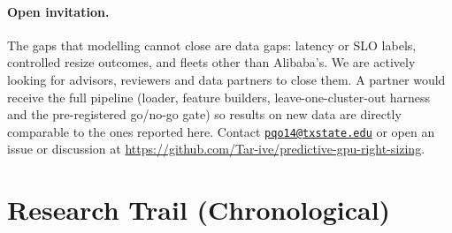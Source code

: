 \documentclass[11pt]{article}
\begin{document}
\paragraph{Open invitation.} The gaps that modelling cannot close are data gaps: latency or SLO labels, controlled resize outcomes, and fleets other than Alibaba's. We are actively looking for advisors, reviewers and data partners to close them. A partner would receive the full pipeline (loader, feature builders, leave-one-cluster-out harness and the pre-registered go/no-go gate) so results on new data are directly comparable to the ones reported here. Contact \href{mailto:pqo14@txstate.edu}{\texttt{pqo14@txstate.edu}} or open an issue or discussion at \url{https://github.com/Tar-ive/predictive-gpu-right-sizing}.




\appendix
\section{Research Trail (Chronological)}
\label{app:trail}
\end{document}

